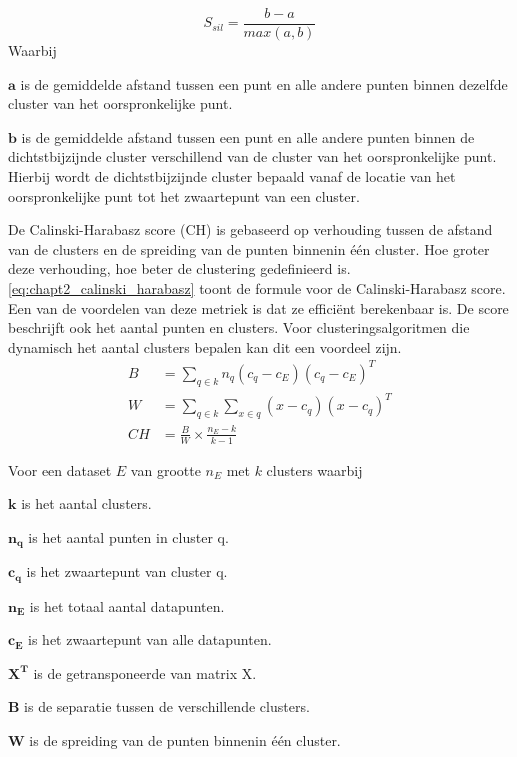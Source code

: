 \begin{equation}
    S_{sil} = \frac{b - a}{max(a,b)}
    \label{eq:chapt2_silhoutte_coeff}
\end{equation}
Waarbij
\begin{description}
    \item$\mathbf{a}$ is de gemiddelde afstand tussen een punt en alle andere punten binnen dezelfde cluster van het oorspronkelijke punt.
    \item$\mathbf{b}$ is de gemiddelde afstand tussen een punt en alle andere punten binnen de dichtstbijzijnde cluster verschillend van de cluster van het oorspronkelijke punt. Hierbij wordt de dichtstbijzijnde cluster bepaald vanaf de locatie van het oorspronkelijke punt tot het zwaartepunt van een cluster.
\end{description}

De Calinski-Harabasz score (CH) is gebaseerd op verhouding tussen de afstand van de clusters en de spreiding van de punten binnenin één cluster. Hoe groter deze verhouding, hoe beter de clustering gedefinieerd is. \autoref{eq:chapt2_calinski_harabasz} toont de formule voor de Calinski-Harabasz score. \cite{calinski_paper} Een van de voordelen van deze metriek is dat ze efficiënt berekenbaar is. De score beschrijft ook het aantal punten en clusters. Voor clusteringsalgoritmen die dynamisch het aantal clusters bepalen kan dit een voordeel zijn.
\begin{equation}
    \begin{split}
        B & = \sum_{q \in k} n_q(c_q - c_E)(c_q-c_E)^{T} \\
        W & = \sum_{q \in k} \sum_{x \in q} (x-c_q)(x-c_q)^{T} \\
        CH & = \frac{B}{W} \times \frac{n_E-k}{k-1}
    \end{split}
    \label{eq:chapt2_calinski_harabasz}
\end{equation}

Voor een dataset $E$ van grootte $n_E$ met $k$ clusters waarbij
\begin{description}
    \item$\mathbf{k}$ is het aantal clusters.
    \item$\mathbf{n_q}$ is het aantal punten in cluster q.
    \item$\mathbf{c_q}$ is het zwaartepunt van cluster q.
    \item$\mathbf{n_E}$ is het totaal aantal datapunten.
    \item$\mathbf{c_E}$ is het zwaartepunt van alle datapunten.
    \item$\mathbf{X^T}$ is de getransponeerde van matrix X. 
    \item$\mathbf{B}$ is de separatie tussen de verschillende clusters.
    \item$\mathbf{W}$ is de spreiding van de punten binnenin één cluster.
\end{description}

